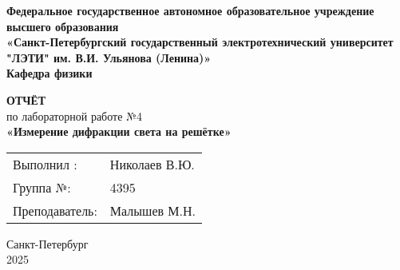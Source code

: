 \begin{center}
	\textbf{Федеральное государственное автономное образовательное учреждение высшего образования} \\
	\textbf{«Санкт-Петербургский государственный электротехнический университет "ЛЭТИ" им. В.И. Ульянова (Ленина)»} \\
	\vspace{0.5cm}
	\textbf{Кафедра физики}
\end{center}

\begin{center}
	\vspace{4cm}
	\textbf{\LARGE ОТЧЁТ}\\
	по лабораторной работе №4 \\
	\vspace{0.5cm}
	\textbf{«Измерение дифракции света на решётке»}
	\vspace{2cm}
\end{center}

\begin{tabular}{@{} l l @{}}
	Выполнил :     & Николаев В.Ю. \\[0.5em]
	Группа  №:     & 4395          \\[2em]
	Преподаватель: & Малышев М.Н.
\end{tabular}

\begin{center}
	\vfill
	Санкт-Петербург \\
	2025
\end{center}
